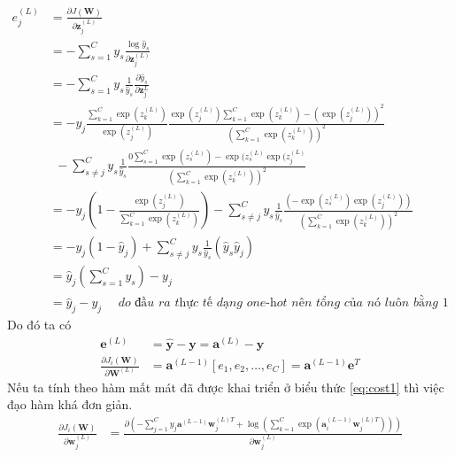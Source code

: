 \begin{enumerate}
\begin{equation*}
\begin{split}
e_j^{(L)} &= \frac{\partial J(\textbf{W}) }{\partial \textbf{z}_j^{(L)}} \\
&=-\sum^{C}_{s=1} y_{s}\frac{ \log \widehat{y}_{s}}{\partial \textbf{z}_j^{(L)}} \\
&=-\sum^{C}_{s=1} y_s \frac{1}{\widehat{y}_s}\frac{\partial \widehat{y}_s}{\partial \textbf{z}^L_j}\\
& = - y_{j}\frac{\sum^C_{k=1}\exp{(z^{(L)}_k)}}{\exp{(z^{(L)}_j)}} \frac{\exp(z^{(L)}_j) \sum^C_{k=1}\exp(z^{(L)}_k) - (\exp(z^{(L)}_{j}))^2}{\left(\sum^C_{k=1}\exp(z^{(L)}_k)\right)^2}\\
&~~ - \sum^C_{s\neq j} y_s \frac{1}{\widehat{y}_s}  \frac{0\sum^C_{s=1}\exp(z^{(L)}_s) - \exp(z^{(L)}_{s}\exp(z^{(L)}_{j}} {\left(\sum^C_{k=1}\exp(z^{(L)}_k)\right)^2}\\
&= -y_{j}\left(1-\frac{\exp(z^{(L)}_j)}{\sum^C_{k=1}\exp(z^{(L)}_k)}\right) - \sum^C_{s\neq j} y_s \frac{1}{\widehat{y}_s}\frac{\left(-\exp(z^{(L)}_{s})\exp(z^{(L)}_{j})\right)} {\left(\sum^C_{k=1}\exp(z^{(L)}_k)\right)^2} \\
& = -y_{j} \left( 1-\widehat{y}_j \right) +  \sum^C_{s\neq j}y_s \frac{1}{\widehat{y}_s}	(\widehat{y}_s	\widehat{y}_j)\\
& = \widehat{y}_j\left(\sum_{s=1}^C   y_s\right) -y_{j}\\
& = \widehat{y}_j - y_j ~~~~~~\textit{do đầu ra thực tế dạng one-hot nên tổng của nó luôn bằng 1}
\end{split}
\end{equation*}
Do đó ta có
\begin{equation}
\label{eq:back_gra1}
\begin{split}
\textbf{e}^{(L)} & = \widehat{\textbf{y}} - \textbf{y} = \textbf{a}^{(L)}-\textbf{y}\\
\frac{\partial J_i(\textbf{W})}{\partial \textbf{W}^{(L)}}& = \textbf{a}^{(L-1)}[e_1,e_2,\ldots,e_C]=\textbf{a}^{(L-1)}\textbf{e}^{T}
\end{split}
\end{equation}
Nếu ta tính theo hàm mất mát đã được khai triển ở biểu thức \ref{eq:cost1} thì việc đạo hàm khá đơn giản.
\begin{equation*}
\begin{split}
\frac{\partial J_i(\textbf{W})}{\partial \textbf{w}^{(L)}_j}  
&=\frac{\partial \left( -\sum_{j=1}^C y_{j} \textbf{a}^{(L-1)}\textbf{w}^{(L)T}_{j} + \log\left(\sum_{k=1}^C \exp(\textbf{a}^{(L-1)}_i\textbf{w}^{(L)T}_{j})\right) \right)}{\partial \textbf{w}^{(L)}_j}\\

\end{split}
\end{equation*}
\end{enumerate}
